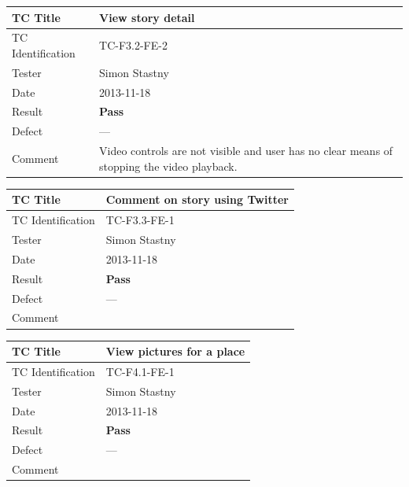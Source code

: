 \documentclass[11pt]{book}
\begin{document}
\begin{center}\begin{tabular}{| l | p{11cm} |} \hline
    TC Title          & View story detail                         \\ \hline 
    TC Identification & TC-F3.2-FE-2                              \\ \hline 
    Tester            & Simon Stastny                             \\ \hline 
    Date              & 2013-11-18                                \\ \hline 
    Result            & \textbf{Pass}                             \\ \hline 
    Defect            & ---                                       \\ \hline 
    Comment           & Video controls are not visible and user
                        has no clear means of stopping the 
                        video playback.                           \\
  \hline 
\end{tabular}\end{center}

\begin{center}\begin{tabular}{| l | p{11cm} |} \hline
    TC Title          & Comment on story using Twitter            \\ \hline 
    TC Identification & TC-F3.3-FE-1                              \\ \hline 
    Tester            & Simon Stastny                             \\ \hline 
    Date              & 2013-11-18                                \\ \hline 
    Result            & \textbf{Pass}                             \\ \hline 
    Defect            & ---                                       \\ \hline 
    Comment           &                                           \\
  \hline 
\end{tabular}\end{center}

\begin{center}\begin{tabular}{| l | p{11cm} |} \hline
    TC Title          & View pictures for a place                 \\ \hline 
    TC Identification & TC-F4.1-FE-1                              \\ \hline 
    Tester            & Simon Stastny                             \\ \hline 
    Date              & 2013-11-18                                \\ \hline 
    Result            & \textbf{Pass}                             \\ \hline 
    Defect            & ---                                       \\ \hline 
    Comment           &                                           \\
  \hline 
\end{tabular}\end{center}
\end{document}
